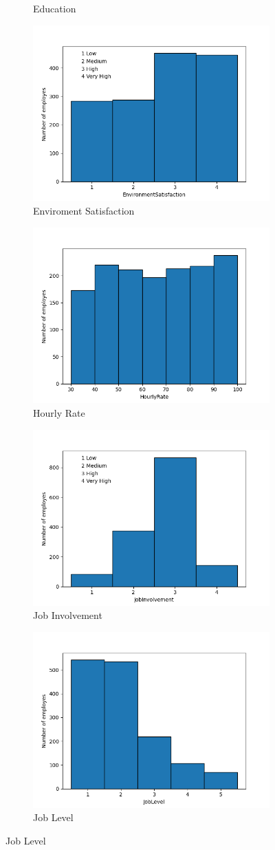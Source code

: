 \documentclass[english]{article}
\begin{document}
\begin{figure} [h]
\begin{subfigure}{.5\textwidth}
  \caption{Education}
  \label{fig:sfig4}
\end{subfigure}%
\begin{subfigure}{.5\textwidth}
  \centering
  \includegraphics[width=.5\linewidth]{Enviroment Satisfaction.png}
  \caption{Enviroment Satisfaction}
  \label{fig:sfig5}
\end{subfigure}%
\begin{subfigure}{.5\textwidth}
  \centering
  \includegraphics[width=.5\linewidth]{HourlyRate.png}
  \caption{Hourly Rate}
  \label{fig:sfig6}
\end{subfigure}
\begin{subfigure}{.5\textwidth}
  \centering
  \includegraphics[width=.5\linewidth]{JobInvolvement.png}
  \caption{Job Involvement}
  \label{fig:sfig7}
\end{subfigure}%
\begin{subfigure}{.5\textwidth}
  \centering
  \includegraphics[width=.5\linewidth]{joblevel.png}
  \caption{Job Level}
  \label{fig:sfig8}
\end{subfigure}
\end{figure}
\end{document}
